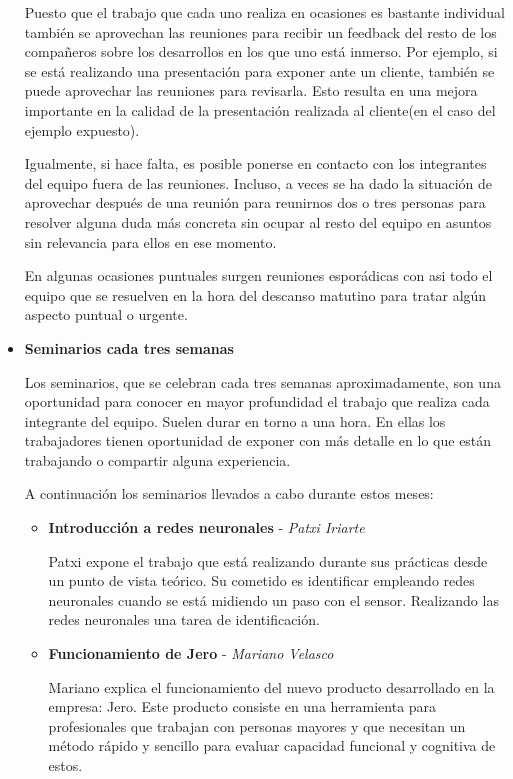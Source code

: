 \begin{itemize}
			Puesto que el trabajo que cada uno realiza en ocasiones es bastante individual también se aprovechan las reuniones para recibir un feedback del resto de los compañeros sobre los desarrollos en los que uno está inmerso. Por ejemplo, si se está realizando una presentación para exponer ante un cliente, también se puede aprovechar las reuniones para revisarla. Esto resulta en una mejora importante en la calidad de la presentación realizada al cliente(en el caso del ejemplo expuesto).
					
			Igualmente, si hace falta, es posible ponerse en contacto con los integrantes del equipo fuera de las reuniones. Incluso, a veces se ha dado la situación de aprovechar después de una reunión para reunirnos dos o tres personas para resolver alguna duda más concreta sin ocupar al resto del equipo en asuntos sin relevancia para ellos en ese momento.
			
			En algunas ocasiones puntuales surgen reuniones esporádicas con asi todo el equipo que se resuelven en la hora del descanso matutino para tratar algún aspecto puntual o urgente.
			
			\medskip
			
			\item \textbf{Seminarios cada tres semanas}
			
			\smallskip
			Los seminarios, que se celebran cada tres semanas aproximadamente, son una oportunidad para conocer en mayor profundidad el trabajo que realiza cada integrante del equipo. Suelen durar en torno a una hora. En ellas los trabajadores tienen oportunidad de exponer con más detalle en lo que están trabajando o compartir alguna experiencia.
			
			A continuación los seminarios llevados a cabo durante estos meses:
			
			\begin{itemize}
				\item \textbf{Introducción a redes neuronales} - \textit{Patxi Iriarte} 
				
				\smallskip	Patxi  expone el trabajo que está realizando durante sus prácticas desde un punto de vista teórico. Su cometido es identificar empleando redes neuronales cuando se está midiendo un paso con el sensor. Realizando las redes neuronales una tarea de identificación.
				\smallskip
				
				\item \textbf{Funcionamiento de Jero} - \textit{Mariano Velasco}
				
				\smallskip
				Mariano explica el funcionamiento del nuevo producto desarrollado en la empresa: Jero. Este producto consiste en una herramienta para profesionales que trabajan con personas mayores y que necesitan un método rápido y sencillo para evaluar capacidad funcional y cognitiva de estos.
				\smallskip
				

\end{itemize}
\end{itemize}
